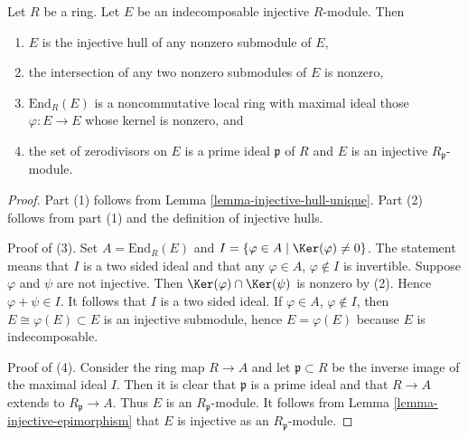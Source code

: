 \begin{lemma}
\label{lemma-indecomposable-injective}
Let $R$ be a ring. Let $E$ be an indecomposable injective $R$-module.
Then
\begin{enumerate}
\item $E$ is the injective hull of any nonzero submodule of $E$,
\item the intersection of any two nonzero submodules of $E$ is nonzero,
\item $\text{End}_R(E)$ is a noncommutative local ring with maximal
ideal those $\varphi : E \to E$ whose kernel is nonzero, and
\item the set of zerodivisors on $E$ is a prime ideal $\mathfrak p$ of $R$
and $E$ is an injective $R_\mathfrak p$-module.
\end{enumerate}
\end{lemma}

\begin{proof}
Part (1) follows from Lemma \ref{lemma-injective-hull-unique}.
Part (2) follows from part (1) and the definition of injective hulls.

\medskip\noindent
Proof of (3). Set $A = \text{End}_R(E)$ and
$I = \{\varphi \in A \mid \Ker(\varphi) \not = 0\}$.
The statement means that $I$ is a two sided ideal and
that any $\varphi \in A$, $\varphi \not \in I$ is invertible.
Suppose $\varphi$ and $\psi$ are not injective.
Then $\Ker(\varphi) \cap \Ker(\psi)$ is nonzero
by (2). Hence $\varphi + \psi \in I$. It follows that $I$
is a two sided ideal. If $\varphi \in A$, $\varphi \not \in I$,
then $E \cong \varphi(E) \subset E$ is an injective submodule,
hence $E = \varphi(E)$ because $E$ is indecomposable.

\medskip\noindent
Proof of (4). Consider the ring map $R \to A$ and let $\mathfrak p \subset R$
be the inverse image of the maximal ideal $I$. Then it is clear
that $\mathfrak p$ is a prime ideal and that $R \to A$ extends to
$R_\mathfrak p \to A$. Thus $E$ is an $R_\mathfrak p$-module.
It follows from Lemma \ref{lemma-injective-epimorphism} that $E$ is injective
as an $R_\mathfrak p$-module.
\end{proof}
